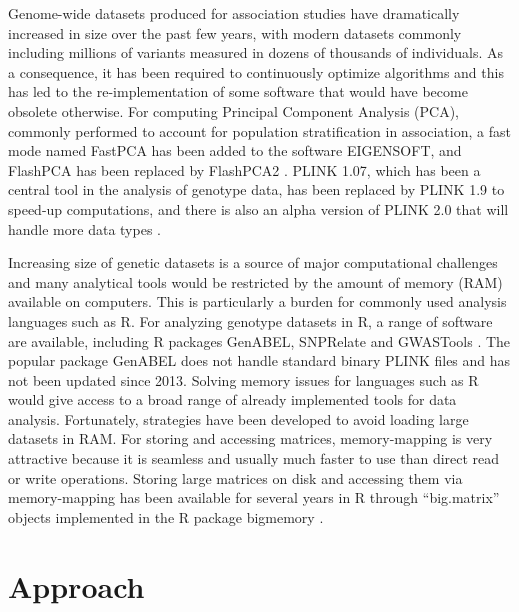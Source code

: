 \documentclass{bioinfo}
\begin{document}
{\color{red}
Genome-wide datasets produced for association studies have dramatically increased in size over the past few years, with modern datasets commonly including millions of variants measured in dozens of thousands of individuals.
As a consequence, it has been required to continuously optimize algorithms and this has led to the re-implementation of some software that would have become obsolete otherwise. For computing Principal Component Analysis (PCA), commonly performed to account for population stratification in association, a fast mode named FastPCA has been added to the software EIGENSOFT, and FlashPCA has been replaced by FlashPCA2 \cite[]{Abraham2014a,Abraham2016a,Galinsky2016,Price2006}. 
PLINK 1.07, which has been a central tool in the analysis of genotype data, has been replaced by PLINK 1.9 to speed-up computations, and there is also an alpha version of PLINK 2.0 that will handle more data types \cite[]{chang2015second,Purcell2007}. 

Increasing size of genetic datasets is a source of major computational challenges and many analytical tools would be restricted by the amount of memory (RAM) available on computers.
This is particularly a burden for commonly used analysis languages such as R.
For analyzing genotype datasets in R, a range of software are available, including R packages GenABEL, SNPRelate and GWASTools \cite[]{aulchenko2007genabel,Gogarten2012,zheng2012high}. The popular package GenABEL does not handle standard binary PLINK files and has not been updated since 2013.
Solving memory issues for languages such as R would give access to a broad range of already implemented tools for data analysis. Fortunately, strategies have been developed to avoid loading large datasets in RAM. For storing and accessing matrices, memory-mapping is very attractive because it is seamless and usually much faster to use than direct read or write operations. Storing large matrices on disk and accessing them via memory-mapping has been available for several years in R through ``big.matrix'' objects implemented in the R package bigmemory \cite[]{Kane2013}.
}

\section{Approach}
\end{document}
